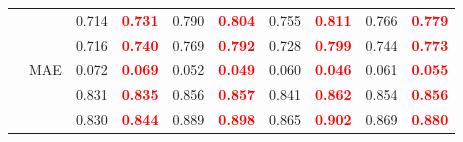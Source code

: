 \documentclass[runningheads]{llncs}
\begin{document}
\begin{table}[H]
{\begin{tabular}{l|l|cc|cc|cc|cc}
                                               &                                                    & 0.714                           & \textcolor{red}{\textbf{0.731}} & 0.790                           & \textcolor{red}{\textbf{0.804}} & 0.755 & \textcolor{red}{\textbf{0.811}} & 0.766                           & \textcolor{red}{\textbf{0.779}} \\
                                               &                                         & 0.716                           & \textcolor{red}{\textbf{0.740}} & 0.769                           & \textcolor{red}{\textbf{0.792}} & 0.728 & \textcolor{red}{\textbf{0.799}} & 0.744                           & \textcolor{red}{\textbf{0.773}} \\
                                               & MAE                                                         & 0.072                           & \textcolor{red}{\textbf{0.069}} & 0.052                           & \textcolor{red}{\textbf{0.049}} & 0.060 & \textcolor{red}{\textbf{0.046}} & 0.061                           & \textcolor{red}{\textbf{0.055}} \\
                                               &                                                      & 0.831                           & \textcolor{red}{\textbf{0.835}} & 0.856                           & \textcolor{red}{\textbf{0.857}} & 0.841 & \textcolor{red}{\textbf{0.862}} & 0.854                           & \textcolor{red}{\textbf{0.856}} \\
                                               &                                                      & 0.830                           & \textcolor{red}{\textbf{0.844}} & 0.889                           & \textcolor{red}{\textbf{0.898}} & 0.865 & \textcolor{red}{\textbf{0.902}} & 0.869                           & \textcolor{red}{\textbf{0.880}} \\ \bottomrule
  \end{tabular}}
\end{table}



\end{document}
